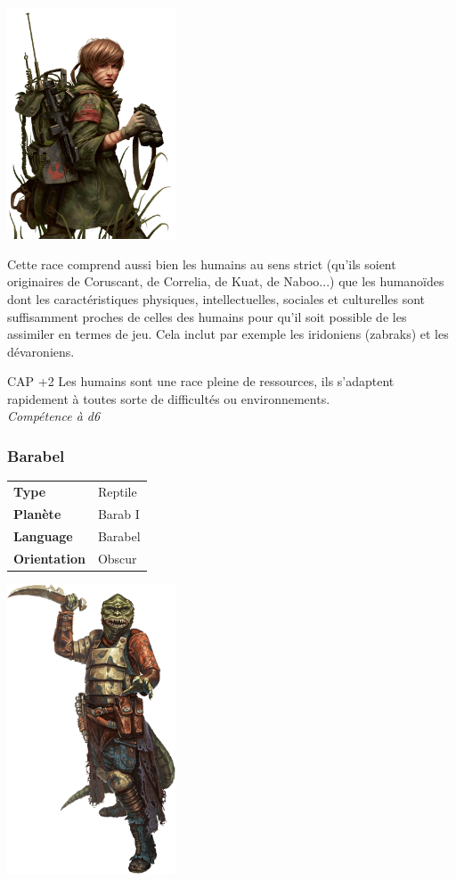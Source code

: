 \includegraphics[width=5cm]{img/races/humain.png} 

Cette race comprend aussi bien les humains au sens strict (qu’ils soient originaires de Coruscant, de Correlia, de Kuat, de Naboo...) que les humanoïdes dont les caractéristiques physiques, intellectuelles, sociales et culturelles sont suffisamment proches de celles des humains pour qu’il soit possible de les assimiler en termes de jeu. Cela inclut par exemple les iridoniens (zabraks) et les dévaroniens.

\begin{description}[align=left]
\item [Adaptabilité] 	CAP +2
	Les humains sont une race pleine de ressources, ils s'adaptent rapidement à toutes sorte de difficultés ou environnements.\\
	\emph{Compétence à d6}
\end{description}

\subsubsection{Barabel}

\begin{flushright}
\begin{tabular}{ l l }
	\textbf{Type} 			& Reptile \\
   	\textbf{Planète} 		& Barab I \\
   	\textbf{Language} 		& Barabel \\
   	\textbf{Orientation} 	& Obscur \\
\end{tabular}
\end{flushright}

\vspace{-50}
\includegraphics[width=5cm]{img/races/barabel.png}

